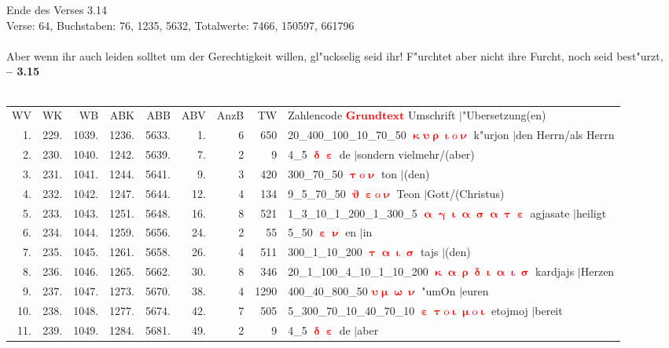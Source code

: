 \documentclass[a4paper,10pt,landscape]{article}
\begin{document}
Ende des Verses 3.14\\
Verse: 64, Buchstaben: 76, 1235, 5632, Totalwerte: 7466, 150597, 661796\\
\\
Aber wenn ihr auch leiden solltet um der Gerechtigkeit willen, gl"uckselig seid ihr! F"urchtet aber nicht ihre Furcht, noch seid best"urzt,\\
\newpage 
{\bf -- 3.15}\\
\medskip \\
\begin{tabular}{rrrrrrrrp{120mm}}
WV&WK&WB&ABK&ABB&ABV&AnzB&TW&Zahlencode \textcolor{red}{$\boldsymbol{Grundtext}$} Umschrift $|$"Ubersetzung(en)\\
1.&229.&1039.&1236.&5633.&1.&6&650&20\_400\_100\_10\_70\_50 \textcolor{red}{$\boldsymbol{\upkappa\upsilon\uprho\upiota\mathrm{o}\upnu}$} k"urjon $|$den Herrn/als Herrn\\
2.&230.&1040.&1242.&5639.&7.&2&9&4\_5 \textcolor{red}{$\boldsymbol{\updelta\upepsilon}$} de $|$sondern vielmehr/(aber)\\
3.&231.&1041.&1244.&5641.&9.&3&420&300\_70\_50 \textcolor{red}{$\boldsymbol{\uptau\mathrm{o}\upnu}$} ton $|$(den)\\
4.&232.&1042.&1247.&5644.&12.&4&134&9\_5\_70\_50 \textcolor{red}{$\boldsymbol{\upvartheta\upepsilon\mathrm{o}\upnu}$} Teon $|$Gott/(Christus)\\
5.&233.&1043.&1251.&5648.&16.&8&521&1\_3\_10\_1\_200\_1\_300\_5 \textcolor{red}{$\boldsymbol{\upalpha\upgamma\upiota\upalpha\upsigma\upalpha\uptau\upepsilon}$} agjasate $|$heiligt\\
6.&234.&1044.&1259.&5656.&24.&2&55&5\_50 \textcolor{red}{$\boldsymbol{\upepsilon\upnu}$} en $|$in\\
7.&235.&1045.&1261.&5658.&26.&4&511&300\_1\_10\_200 \textcolor{red}{$\boldsymbol{\uptau\upalpha\upiota\upsigma}$} tajs $|$(den)\\
8.&236.&1046.&1265.&5662.&30.&8&346&20\_1\_100\_4\_10\_1\_10\_200 \textcolor{red}{$\boldsymbol{\upkappa\upalpha\uprho\updelta\upiota\upalpha\upiota\upsigma}$} kardjajs $|$Herzen\\
9.&237.&1047.&1273.&5670.&38.&4&1290&400\_40\_800\_50 \textcolor{red}{$\boldsymbol{\upsilon\upmu\upomega\upnu}$} "umOn $|$euren\\
10.&238.&1048.&1277.&5674.&42.&7&505&5\_300\_70\_10\_40\_70\_10 \textcolor{red}{$\boldsymbol{\upepsilon\uptau\mathrm{o}\upiota\upmu\mathrm{o}\upiota}$} etojmoj $|$bereit\\
11.&239.&1049.&1284.&5681.&49.&2&9&4\_5 \textcolor{red}{$\boldsymbol{\updelta\upepsilon}$} de $|$aber\\

\end{tabular}
\end{document}
